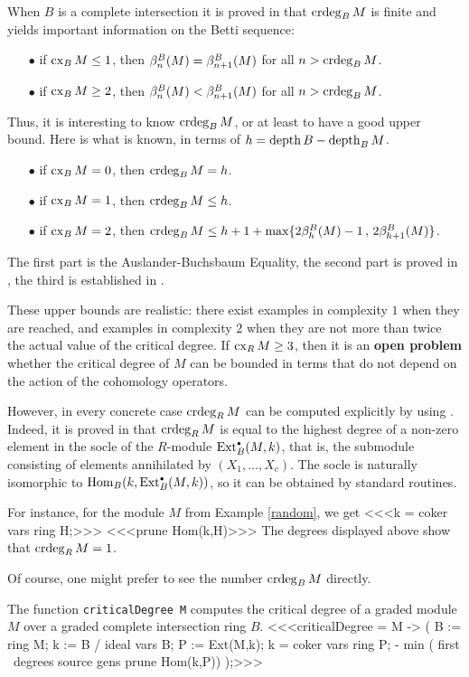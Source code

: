 When $B$ is a complete intersection it is proved in
\cite[Sect.~7]{CI:MR99c:13033} that $\operatorname{crdeg}_BM$ is finite and yields
important information on the Betti sequence:
\begin{itemize}
\item[$\bullet$]
if $\operatorname{cx}_BM\le1$, then $\beta^B_n(M) =\beta^B_{n+1}(M)$ for all $n>\operatorname{crdeg}_BM$.
\item[$\bullet$]
if $\operatorname{cx}_BM\ge2$, then $\beta^B_n(M)<\beta^B_{n+1}(M)$ for all $n>\operatorname{crdeg}_BM$.
\end{itemize}
Thus, it is interesting to know $\operatorname{crdeg}_BM$, or at least to have a good
upper bound.  Here is what is known, in terms of $h=\operatorname{depth} B-\operatorname{depth}_BM$.
\begin{itemize}
\item[$\bullet$]
if $\operatorname{cx}_BM=0$, then $\operatorname{crdeg}_BM=h$.
\item[$\bullet$]
if $\operatorname{cx}_BM=1$, then $\operatorname{crdeg}_BM\le h$.
\item[$\bullet$]
if $\operatorname{cx}_BM=2$, then $\operatorname{crdeg}_BM\le h+1+\max\{2\beta^B_h(M)-1\,,\,
2\beta^B_{h+1}(M)\}$.
\end{itemize}
The first part is the Auslander-Buchsbaum Equality, the second part is
proved in \cite[Sect.~6]{CI:Ei}, the third is established in
\cite[Sect.~7]{CI:MR1774757}.

These upper bounds are realistic:  there exist examples in complexity
$1$ when they are reached, and examples in complexity $2$ when they are
not more than twice the actual value of the critical degree.  If
$\operatorname{cx}_RM\ge3$, then it is an {\bf open problem} whether the critical
degree of $M$ can be bounded in terms that do not depend on the action
of the cohomology operators.

However, in every concrete case $\operatorname{crdeg}_RM$ can be computed explicitly
by using \Mtwo.  Indeed, it is proved in \cite[Sect.~7]{CI:MR99c:13033}
that $\operatorname{crdeg}_RM$ is equal to the highest degree of a non-zero element
in the socle of the $R$-module $\operatorname{Ext}^{\scriptscriptstyle\bullet}_B(M,k)$, that is, the
submodule consisting of elements annihilated by $(X_1,\dots,X_c)$.  The
socle is naturally isomorphic to $\operatorname{Hom}_B(k,\operatorname{Ext}^{\scriptscriptstyle\bullet}_B(M,k))$, so it can
be obtained by standard \Mtwo routines.

For instance, for the module $M$ from Example \ref{random}, we get
<<<k = coker vars ring H;>>>
<<<prune Hom(k,H)>>>
The degrees displayed above show that $\operatorname{crdeg}_RM=1$.
\medskip

Of course, one might prefer to see the number $\operatorname{crdeg}_BM$ directly.

\begin{sCode}
The function {\tt criticalDegree M} computes the critical degree of a
graded module $M$ over a graded complete intersection ring $B$.
<<<criticalDegree = M -> (
   B := ring M;
   k := B / ideal vars B;
   P := Ext(M,k);
   k  = coker vars ring P;
   - min ( first \ degrees source gens prune Hom(k,P))
   );>>>
\end{sCode}

